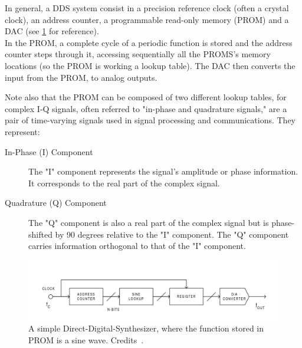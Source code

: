 In general, a DDS system consist in a precision reference clock (often a crystal clock), an address counter, a programmable read-only memory (PROM) and a DAC (see \cref{fig:simple_DDS} for reference).\\
In the PROM, a complete cycle of a periodic function is stored and the address counter steps through it, accessing sequentially  all the PROMS's memory locations (so the PROM is working a lookup table).
The DAC then converts the input from the PROM, to analog outputs.

Note also that the PROM can be composed of two different lookup tables, for complex I-Q signals, often referred to "in-phase and quadrature signals," are a pair of time-varying signals used in signal processing and communications. They represent:
\begin{description}
    \item[In-Phase (I) Component] The "I" component represents the signal's amplitude or phase information. It corresponds to the real part of the complex signal.
    \item[Quadrature (Q) Component] The "Q" component is also a real part of the complex signal but is phase-shifted by 90 degrees relative to the "I" component. The "Q" component carries information orthogonal to that of the "I" component.
\end{description}


\begin{figure}[ht]
    \centering
    \includegraphics[width=\textwidth]{Setup-software/figures/simple_DDS.png}
    \caption{A simple Direct-Digital-Synthesizer, where the function stored in PROM is a sine wave. Credits~\cite{DDS}.}
    \label{fig:simple_DDS}
\end{figure}

